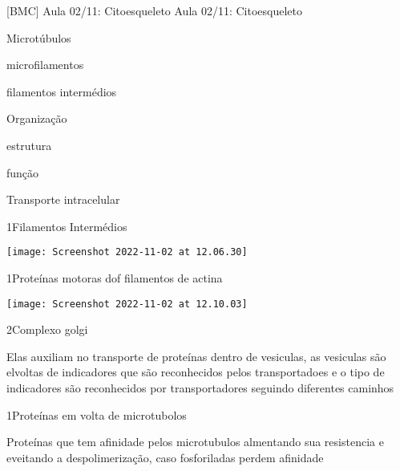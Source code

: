 \documentclass[\mainfilename]{subfiles}
\begin{document}
[BMC]
{Aula 02/11: Citoesqueleto} %
{Aula 02/11: Citoesqueleto} %

\begin{sectionBox}{} %
    
    \begin{itemize}
        \begin{multicols}{2}
            \item Microtúbulos
            \item microfilamentos
            \item filamentos intermédios
            \item Organização
            \item estrutura
            \item função
            \item Transporte intracelular
        \end{multicols}
    \end{itemize}
    
\end{sectionBox}

\begin{sectionBox}1{Filamentos Intermédios} %
    
    \begin{center}
        \texttt{[image: Screenshot 2022-11-02 at 12.06.30]}
    \end{center}
    
\end{sectionBox}

\begin{sectionBox}1{Proteínas motoras dof filamentos de actina} %
    
    \begin{center}
        \texttt{[image: Screenshot 2022-11-02 at 12.10.03]}
    \end{center}

    \begin{sectionBox}2{Complexo golgi} %
        
        Elas auxiliam no transporte de proteínas dentro de vesiculas, as vesiculas são elvoltas de indicadores que são reconhecidos pelos transportadoes e o tipo de indicadores são reconhecidos por transportadores seguindo diferentes caminhos
        
    \end{sectionBox}
    
\end{sectionBox}

\begin{sectionBox}1{Proteínas em volta de microtubolos} %
    
    Proteínas que tem afinidade pelos microtubulos almentando sua resistencia e eveitando a despolimerização, caso fosforiladas perdem afinidade
    
\end{sectionBox}
\end{document}
